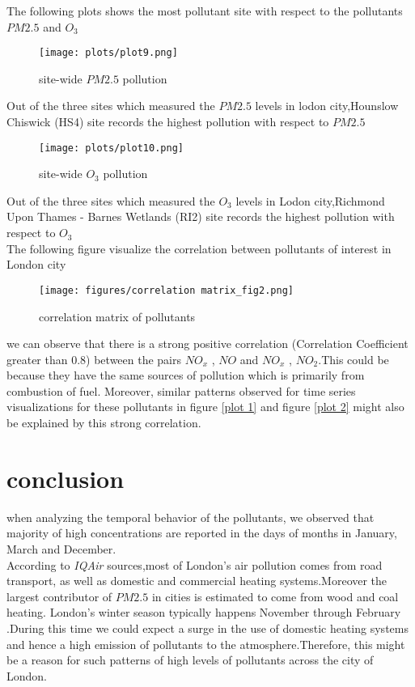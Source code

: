 \documentclass[]{article}
\begin{document}
The following plots shows the most pollutant site with respect to the pollutants $PM2.5$ and $O_3$
  
 
\begin{figure}[H]
	\centering
	\texttt{[image: plots/plot9.png]}	
	\caption{site-wide $PM2.5$ pollution }
	\label{plot 9}
\end{figure}

Out of the three sites which measured the  $PM2.5$ levels in lodon city,Hounslow Chiswick (HS4) site records the highest pollution with respect to $PM2.5$

\begin{figure}[H]
	\centering
	\texttt{[image: plots/plot10.png]}	
	\caption{site-wide $O_3$ pollution }
	\label{plot 10}
\end{figure}
Out of the three sites which measured the  $O_3$ levels in Lodon city,Richmond Upon Thames - Barnes Wetlands (RI2) site records the highest pollution with respect to $O_3$\\

The following figure visualize the correlation between pollutants of interest in London city

\begin{figure}[H]
	\centering
	\texttt{[image: figures/correlation matrix\_fig2.png]}	
	\caption{correlation matrix of pollutants}
	\label{correlation_matrix}
\end{figure}

we can observe that there is a strong positive correlation (Correlation Coefficient greater than 0.8) between the pairs $NO_x$ ,  $NO$ and  $NO_x$ ,  $NO_2$.This could be because they have the same sources of pollution which is primarily from combustion of fuel.
Moreover, similar patterns observed for time series visualizations for these pollutants in figure \ref{plot 1} and figure \ref{plot 2} might also  be explained by this strong correlation. 

\section{conclusion}
when analyzing the temporal behavior of the pollutants, we observed that majority of high concentrations are reported in the days of months in January, March and December.\\
According to \emph{IQAir} sources,most of London's air pollution comes from road transport, as well as domestic and commercial heating systems.Moreover the largest contributor of $PM2.5$ in cities is estimated to come from wood and coal heating.
London's winter season typically happens November through February .During this time we could expect a surge in the use of domestic heating systems and hence a high emission of pollutants to the atmosphere.Therefore, this might be a reason for such patterns of high levels of pollutants across the city of London.
\newline
\end{document}
